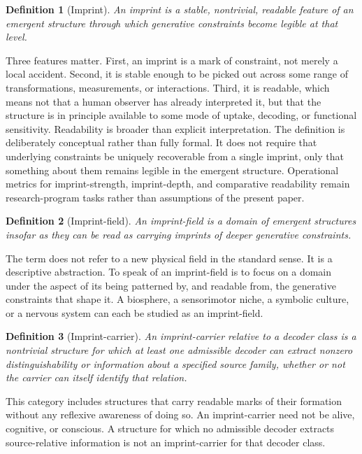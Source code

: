 \documentclass[12pt,a4paper]{article}
\newtheorem{definition}{Definition}[section]
\begin{document}
\begin{definition}[Imprint]
An \emph{imprint} is a stable, nontrivial, readable feature of an emergent structure through which generative constraints become legible at that level.
\end{definition}

Three features matter. First, an imprint is a mark of constraint, not merely a local accident. Second, it is stable enough to be picked out across some range of transformations, measurements, or interactions. Third, it is readable, which means not that a human observer has already interpreted it, but that the structure is in principle available to some mode of uptake, decoding, or functional sensitivity. Readability is broader than explicit interpretation. The definition is deliberately conceptual rather than fully formal. It does not require that underlying constraints be uniquely recoverable from a single imprint, only that something about them remains legible in the emergent structure. Operational metrics for imprint-strength, imprint-depth, and comparative readability remain research-program tasks rather than assumptions of the present paper.

\begin{definition}[Imprint-field]
An \emph{imprint-field} is a domain of emergent structures insofar as they can be read as carrying imprints of deeper generative constraints.
\end{definition}

The term does not refer to a new physical field in the standard sense. It is a descriptive abstraction. To speak of an imprint-field is to focus on a domain under the aspect of its being patterned by, and readable from, the generative constraints that shape it. A biosphere, a sensorimotor niche, a symbolic culture, or a nervous system can each be studied as an imprint-field.

\begin{definition}[Imprint-carrier]
An \emph{imprint-carrier relative to a decoder class} is a nontrivial
structure for which at least one admissible decoder can extract nonzero
distinguishability or information about a specified source family,
whether or not the carrier can itself identify that relation.
\end{definition}

This category includes structures that carry readable marks of their
formation without any reflexive awareness of doing so. An
imprint-carrier need not be alive, cognitive, or conscious. A structure
for which no admissible decoder extracts source-relative information is
not an imprint-carrier for that decoder class.
\end{document}
